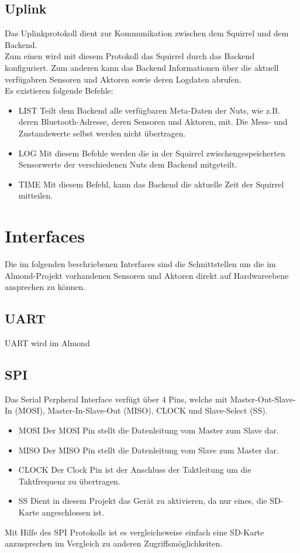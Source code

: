 \documentclass[12pt,a4paper]{article}
\begin{document}
	\subsection{Uplink}
Das Uplinkprotokoll dient zur Kommunikation zwischen dem Squirrel und dem Backend.\\
Zum einen wird mit diesem Protokoll das Squirrel durch das Backend konfiguriert. Zum anderen kann das Backend Informationen über die aktuell verfügabren Sensoren und Aktoren sowie deren Logdaten abrufen.\\
Es existieren folgende Befehle:
\begin{itemize}
	\item{LIST}
Teilt dem Backend alle verfügbaren Meta-Daten der Nuts, wie z.B. deren Bluetooth-Adresse, deren Sensoren und Aktoren, mit. Die Mess- und Zustandswerte selbst werden nicht übertragen.

	\item{LOG}
Mit diesem Befehle werden die in der Squirrel zwischengespeicherten Sensorwerte der verschiedenen Nuts dem Backend mitgeteilt.

	\item{TIME}
Mit diesem Befehl, kann das Backend die aktuelle Zeit der Squirrel mitteilen.

\end{itemize}

\section{Interfaces}
Die im folgenden beschriebenen Interfaces sind die Schnittstellen um die im Almond-Projekt vorhandenen Sensoren und Aktoren direkt auf Hardwareebene ansprechen zu können.
	\subsection{UART}
UART wird im Almond

	\subsection{SPI}
Das Serial Perpheral Interface verfügt über 4 Pins, welche mit Master-Out-Slave-In (MOSI), Master-In-Slave-Out (MISO), CLOCK und Slave-Select (SS).
\begin{itemize}
\item MOSI
Der MOSI Pin stellt die Datenleitung vom Master zum Slave dar.
\item MISO
Der MISO Pin stellt die Datenleitung vom Slave zum Master dar.
\item CLOCK
Der Clock Pin ist der Anschluss der Taktleitung um die Taktfrequenz zu übertragen.
\item SS
Dient in diesem Projekt das Gerät zu aktivieren, da nur eines, die SD-Karte angeschlossen ist.
\end{itemize}
Mit Hilfe des SPI Protokolls ist es vergleichsweise einfach eine SD-Karte anzusprechen im Vergleich zu anderen Zugriffsmöglichkeiten.
\end{document}
